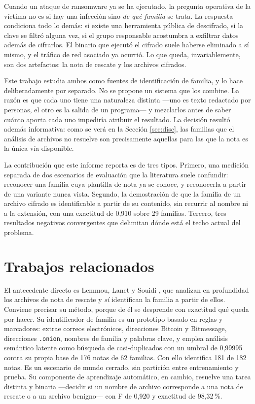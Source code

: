 \documentclass[11pt,a4paper]{article}
\begin{document}
Cuando un ataque de ransomware ya se ha ejecutado, la pregunta operativa de la víctima no es
si hay una infección sino \emph{de qué familia} se trata. La respuesta condiciona todo lo
demás: si existe una herramienta pública de descifrado, si la clave se filtró alguna vez, si
el grupo responsable acostumbra a exfiltrar datos además de cifrarlos. El binario que ejecutó
el cifrado suele haberse eliminado a sí mismo, y el tráfico de red asociado ya ocurrió. Lo
que queda, invariablemente, son dos artefactos: la nota de rescate y los archivos cifrados.

Este trabajo estudia ambos como fuentes de identificación de familia, y lo hace
deliberadamente por separado. No se propone un sistema que los combine. La razón es que cada
uno tiene una naturaleza distinta ---uno es texto redactado por personas, el otro es la salida
de un programa--- y mezclarlos antes de saber cuánto aporta cada uno impediría atribuir el
resultado. La decisión resultó además informativa: como se verá en la Sección \ref{sec:disc},
las familias que el análisis de archivos no resuelve son precisamente aquellas para las que la
nota es la única vía disponible.

La contribución que este informe reporta es de tres tipos. Primero, una medición separada de
dos escenarios de evaluación que la literatura suele confundir: reconocer una familia cuya
plantilla de nota ya se conoce, y reconocerla a partir de una variante nunca vista. Segundo,
la demostración de que la familia de un archivo cifrado es identificable a partir de su
contenido, sin recurrir al nombre ni a la extensión, con una exactitud de 0,910 sobre 29
familias. Tercero, tres resultados negativos convergentes que delimitan dónde está el techo
actual del problema.

\section{Trabajos relacionados}

El antecedente directo es Lemmou, Lanet y Souidi \cite{lemmou2021}, que analizan en
profundidad los archivos de nota de rescate y \emph{sí} identifican la familia a partir de
ellos. Conviene precisar su método, porque de él se desprende con exactitud qué queda por
hacer. Su identificador de familia es un prototipo basado en reglas y marcadores: extrae
correos electrónicos, direcciones Bitcoin y Bitmessage, direcciones \texttt{.onion}, nombres
de familia y palabras clave, y emplea análisis semántico latente como búsqueda de
casi-duplicados con un umbral de 0,99995 contra su propia base de 176 notas de 62 familias.
Con ello identifica 181 de 182 notas. Es un escenario de mundo cerrado, sin partición entre
entrenamiento y prueba. Su componente de aprendizaje automático, en cambio, resuelve una tarea
distinta y binaria ---decidir si un nombre de archivo corresponde a una nota de rescate o a un
archivo benigno--- con F de 0,920 y exactitud de 98,32\,\%.
\end{document}
